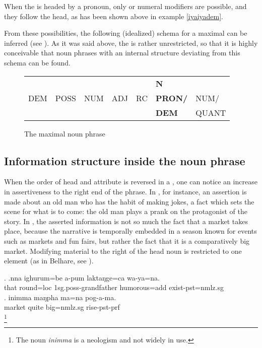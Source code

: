 When the  is headed by a pronoun, only  or numeral modifiers are possible, and they follow the head, as has been shown above in example \ref{iyaiyadem}.
 
 
From these possibilities, the following (idealized) schema for a maximal  can be inferred (see ). As it was said above, the  is rather unrestricted, so that it is highly conceivable that noun phrases with an internal structure deviating from this schema can be found.
 	 
\begin{figure} 
\begin{tabular}{lllllll} 
&&&&&\textbf{N}&\\ 
DEM&POSS&NUM&ADJ&RC&\textbf{PRON/}&NUM/\\
&&&&&\textbf{DEM}&QUANT\\ 
\end{tabular} 
\caption{The maximal noun phrase}\label{np-max} 
\end{figure}
 

\subsection{Information structure inside the noun phrase}

When the order of head and attribute is reversed in a , one can notice an increase in assertiveness to the right end of the phrase. In \Next[a], for instance, an assertion is made about an old man who has the habit of making jokes, a fact which sets the scene for what is to come: the old man plays a prank on the protagonist of the story. In \Next[b], the asserted information is not so much the fact that a market takes place, because the narrative is temporally embedded in a season known for events such as markets and fun fairs, but rather the fact that it is a comparatively big market. Modifying material to the right of the head noun is restricted to one element (as in Belhare, see \citealt[562]{Bickel2003Belhare}).

\ex. \ag.nna  ighurum=be   a-pum                  laktaŋge=ca        wa-ya=na.\\
that round{\sc =loc} {\sc 1sg.poss-}grandfather humorous{\sc =add} exist{\sc [3sg]-pst=nmlz.sg}\\
 
\bg. inimma maŋpha ma=na pog-a-ma.\\
market quite big{\sc =nmlz.sg} rise{\sc [3sg]-pst-prf}\\
\footnote{The noun \emph{inimma} is a neologism and not widely in use.} 
  
